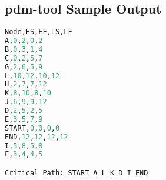 \begin{appendices}

\chapter{pdm-tool Sample Output}
\label{appendix:sample-output}

\begin{lstlisting}[language=python,frame=single,showstringspaces=false]
Node,ES,EF,LS,LF
A,0,2,0,2
B,0,3,1,4
C,0,2,5,7
G,2,6,5,9
L,10,12,10,12
H,2,7,7,12
K,8,10,8,10
J,6,9,9,12
D,2,5,2,5
E,3,5,7,9
START,0,0,0,0
END,12,12,12,12
I,5,8,5,8
F,3,4,4,5

Critical Path: START A L K D I END
\end{lstlisting}

\end{appendices}


